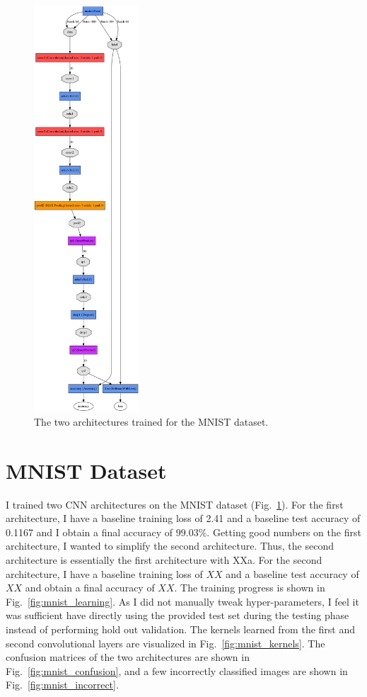 \documentclass[5pt]{article}
\begin{document}
\begin{figure}[T]
  \includegraphics[width=0.35\textwidth]{images/mnist_arch2.png}
  \caption{The two architectures trained for the MNIST dataset.}
\label{fig:mnist_architectures}
\end{figure}

\section{MNIST Dataset}
I trained two CNN architectures on the MNIST dataset
(Fig.~\ref{fig:mnist_architectures}). For the first architecture, I have a
baseline training loss of 2.41 and a baseline test accuracy of 0.1167 and I
obtain a final accuracy of $99.03\%$. Getting good numbers on the first
architecture, I wanted to simplify the second architecture. Thus, the second
architecture is essentially the first architecture with XXa. For the second
architecture, I have a baseline training loss of $XX$ and a baseline test
accuracy of $XX$ and obtain a final accuracy of $XX$. The training progress is
shown in Fig.~\ref{fig:mnist_learning}.  As I did not manually tweak
hyper-parameters, I feel it was sufficient have directly using the provided
test set during the testing phase instead of performing hold out validation.
The kernels learned from the first and second convolutional layers are
visualized in Fig.~\ref{fig:mnist_kernels}. The confusion matrices of the two
architectures are shown in Fig.~\ref{fig:mnist_confusion}, and a few incorrectly
classified images are shown in Fig.~\ref{fig:mnist_incorrect}.
\end{document}

